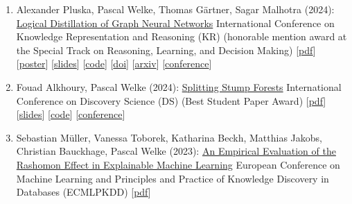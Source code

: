 \documentclass{scrartcl}
\begin{document}
\begin{enumerate}
\conti
\item
\label{pluska2024logicaldistillation}
Alexander Pluska, Pascal Welke, Thomas Gärtner, Sagar Malhotra (2024):\newline
\href{https://dx.doi.org/10.24963/kr.2024/86}{Logical Distillation of Graph Neural Networks}\newline
International Conference on Knowledge Representation and Reasoning (KR)\newline
(honorable mention award at the Special Track on Reasoning, Learning, and Decision Making)\newline
{\footnotesize
[\href{https://pwelke.github.io/publications/pluska2024logicaldistillationkr.pdf}{pdf}]
[\href{https://pwelke.github.io/publications/pluska2024logicaldistillationmiposter.pdf}{poster}]
[\href{https://pwelke.github.io/publications/pluska2024logicaldistillationkrslides.pdf}{slides}]
[\href{https://github.com/lexpk/LogicalDistillationOfGNNs}{code}]
[\href{https://dx.doi.org/10.24963/kr.2024/86}{doi}]
[\href{https://arxiv.org/abs/2406.07126}{arxiv}]
[\href{https://kr.org/KR2024/}{conference}]
}
\item
\label{alkhoury2023splittingstumps}
Fouad Alkhoury, Pascal Welke (2024):\newline
\href{https://pwelke.github.io/publications/alkhoury2024splittingstumps.pdf}{Splitting Stump Forests}\newline
International Conference on
Discovery Science (DS)\newline
(Best Student Paper Award)\newline
{\footnotesize
[\href{https://pwelke.github.io/publications/alkhoury2024splittingstumps.pdf}{pdf}]
[\href{https://pwelke.github.io/publications/alkhoury2024splittingstumpsslides.pdf}{slides}]
[\href{https://github.com/FouadAlkhoury/SplittingStumpsForests/}{code}]
[\href{http://ds2024.isti.cnr.it/}{conference}]
}
\item
\label{mueller2023ecml}
Sebastian Müller, Vanessa Toborek, Katharina Beckh, Matthias Jakobs, Christian Bauckhage, Pascal Welke (2023):\newline
\href{https://dx.doi.org/10.1007/978-3-031-43418-1_28}{An Empirical Evaluation of the Rashomon Effect in Explainable Machine Learning}\newline
European Conference on Machine Learning and Principles and Practice of Knowledge Discovery in Databases (ECMLPKDD)\newline
{\footnotesize
[\href{https://pwelke.github.io/publications/mueller2023rashomon.pdf}{pdf}]
}
\end{enumerate}
\end{document}
